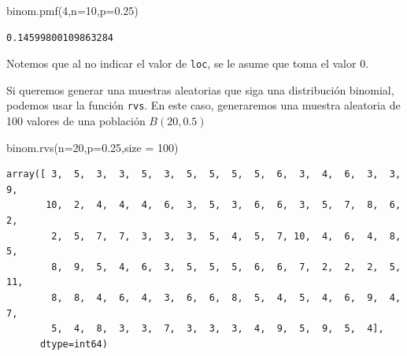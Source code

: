 \documentclass[
  letterpaper,
  DIV=11,
  numbers=noendperiod]{scrreprt}
\newenvironment{Shaded}{\begin{snugshade}}{\end{snugshade}}
\newcommand{\DecValTok}[1]{\textcolor[rgb]{0.68,0.00,0.00}{#1}}
\newcommand{\FloatTok}[1]{\textcolor[rgb]{0.68,0.00,0.00}{#1}}
\newcommand{\NormalTok}[1]{\textcolor[rgb]{0.00,0.23,0.31}{#1}}
\newcommand{\OperatorTok}[1]{\textcolor[rgb]{0.37,0.37,0.37}{#1}}
\begin{document}
\begin{Shaded}
\begin{Highlighting}[]
\NormalTok{binom.pmf(}\DecValTok{4}\NormalTok{,n}\OperatorTok{=}\DecValTok{10}\NormalTok{,p}\OperatorTok{=}\FloatTok{0.25}\NormalTok{)}
\end{Highlighting}
\end{Shaded}

\begin{verbatim}
0.14599800109863284
\end{verbatim}

Notemos que al no indicar el valor de \texttt{loc}, se le asume que toma
el valor 0.

Si queremos generar una muestras aleatorias que siga una distribución
binomial, podemos usar la función \texttt{rvs}. En este caso,
generaremos una muestra aleatoria de 100 valores de una población
\(B(20,0.5)\)

\begin{Shaded}
\begin{Highlighting}[]
\NormalTok{binom.rvs(n}\OperatorTok{=}\DecValTok{20}\NormalTok{,p}\OperatorTok{=}\FloatTok{0.25}\NormalTok{,size }\OperatorTok{=} \DecValTok{100}\NormalTok{)}
\end{Highlighting}
\end{Shaded}

\begin{verbatim}
array([ 3,  5,  3,  3,  5,  3,  5,  5,  5,  5,  6,  3,  4,  6,  3,  3,  9,
       10,  2,  4,  4,  4,  6,  3,  5,  3,  6,  6,  3,  5,  7,  8,  6,  2,
        2,  5,  7,  7,  3,  3,  3,  5,  4,  5,  7, 10,  4,  6,  4,  8,  5,
        8,  9,  5,  4,  6,  3,  5,  5,  5,  6,  6,  7,  2,  2,  2,  5, 11,
        8,  8,  4,  6,  4,  3,  6,  6,  8,  5,  4,  5,  4,  6,  9,  4,  7,
        5,  4,  8,  3,  3,  7,  3,  3,  3,  4,  9,  5,  9,  5,  4],
      dtype=int64)
\end{verbatim}
\end{document}

